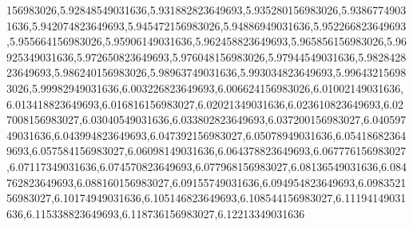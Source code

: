 156983026,5.92848549031636,5.931882823649693,5.935280156983026,5.93867749031636,5.942074823649693,5.945472156983026,5.94886949031636,5.952266823649693,5.955664156983026,5.95906149031636,5.962458823649693,5.965856156983026,5.96925349031636,5.972650823649693,5.976048156983026,5.97944549031636,5.982842823649693,5.986240156983026,5.98963749031636,5.993034823649693,5.996432156983026,5.99982949031636,6.003226823649693,6.006624156983026,6.01002149031636,6.013418823649693,6.016816156983027,6.02021349031636,6.023610823649693,6.027008156983027,6.03040549031636,6.033802823649693,6.037200156983027,6.04059749031636,6.043994823649693,6.047392156983027,6.05078949031636,6.054186823649693,6.057584156983027,6.06098149031636,6.064378823649693,6.067776156983027,6.07117349031636,6.074570823649693,6.077968156983027,6.08136549031636,6.084762823649693,6.088160156983027,6.09155749031636,6.094954823649693,6.098352156983027,6.10174949031636,6.105146823649693,6.108544156983027,6.11194149031636,6.115338823649693,6.118736156983027,6.12213349031636
